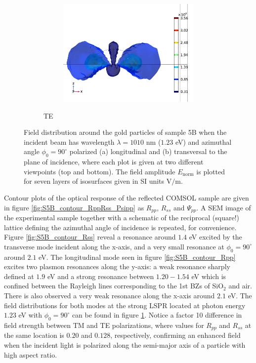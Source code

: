 \begin{figure}
\begin{subfigure}{0.5\textwidth}
    \begin{subfigure}{\textwidth}
        \centering
        \includegraphics[width=0.9\linewidth]{figures/ch4/S5B/fielddistr/s5b_normE_TE_wl1010_phi90(1).png}
    \end{subfigure}
    \caption{TE}
    \end{subfigure}
    \caption{Field distribution around the gold particles of sample 5B when the incident beam has wavelength $\lambda=1010$ nm ($1.23$ eV) and azimuthal angle $\phi_0=90^\circ$ polarized (a) longitudinal and (b) transversal to the plane of incidence, where each plot is given at two different viewpoints (top and bottom). The field amplitude $E_\text{norm}$ is plotted for seven layers of isosurfaces given in SI units V$/$m.}
    \label{fig:S5B_fielddstribution_LSPR_phi90}
\end{figure}

Contour plots of the optical response of the reflected COMSOL sample are given in figure \ref{fig:S5B_contour_RppRss_Psipp} as $R_{pp}$, $R_{ss}$ and $\Psi_{pp}$. A SEM image of the experimental sample together with a schematic of the reciprocal (square!) lattice defining the azimuthal angle of incidence is repeated, for convenience. Figure \ref{fig:S5B_contour_Rss} reveal a resonance around $1.4$ eV excited by the transverse mode incident along the x-axis, and a very small resonance at $\phi_0=90^\circ$ around $2.1$ eV. The longitudinal mode seen in figure \ref{fig:S5B_contour_Rpp} excites two plasmon resonances along the y-axis: a weak resonance sharply defined at $1.9$ eV and a strong resonance between $1.20-1.54$ eV which is confined between the Rayleigh lines corresponding to the 1st BZs of SiO$_2$ and air. There is also observed a very weak resonance along the x-axis around $2.1$ eV. The field distributions for both modes at the strong LSPR located at photon energy $1.23$ eV with $\phi_0=90^\circ$ can be found in figure \ref{fig:S5B_fielddstribution_LSPR_phi90}. Notice a factor 10 difference in field strength between TM and TE polarizations, where values for $R_{pp}$ and $R_{ss}$ at the same location is $0.20$ and $0.128$, respectively, confirming an enhanced field when the incident light is polarized along the semi-major axis of a particle with high aspect ratio.

